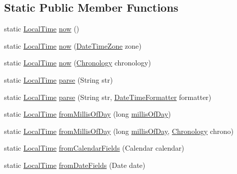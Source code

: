 \subsection*{Static Public Member Functions}
\begin{DoxyCompactItemize}
\item 
static \hyperlink{classorg_1_1joda_1_1time_1_1_local_time}{Local\-Time} \hyperlink{classorg_1_1joda_1_1time_1_1_local_time_a0439c341c8c83e1c624be6065335091b}{now} ()
\item 
static \hyperlink{classorg_1_1joda_1_1time_1_1_local_time}{Local\-Time} \hyperlink{classorg_1_1joda_1_1time_1_1_local_time_a9e4f0e11a9b7e43f07efed2547adf98b}{now} (\hyperlink{classorg_1_1joda_1_1time_1_1_date_time_zone}{Date\-Time\-Zone} zone)
\item 
static \hyperlink{classorg_1_1joda_1_1time_1_1_local_time}{Local\-Time} \hyperlink{classorg_1_1joda_1_1time_1_1_local_time_a6dccb7d9d3dbd3f82c36dd89b72cd1cd}{now} (\hyperlink{classorg_1_1joda_1_1time_1_1_chronology}{Chronology} chronology)
\item 
static \hyperlink{classorg_1_1joda_1_1time_1_1_local_time}{Local\-Time} \hyperlink{classorg_1_1joda_1_1time_1_1_local_time_a00a422bb638ad7b801794ea98f2060af}{parse} (String str)
\item 
static \hyperlink{classorg_1_1joda_1_1time_1_1_local_time}{Local\-Time} \hyperlink{classorg_1_1joda_1_1time_1_1_local_time_a31be2ec840f541810b6d22189c82195b}{parse} (String str, \hyperlink{classorg_1_1joda_1_1time_1_1format_1_1_date_time_formatter}{Date\-Time\-Formatter} formatter)
\item 
static \hyperlink{classorg_1_1joda_1_1time_1_1_local_time}{Local\-Time} \hyperlink{classorg_1_1joda_1_1time_1_1_local_time_a5439485b4aff0ad817e241cd5da729c5}{from\-Millis\-Of\-Day} (long \hyperlink{classorg_1_1joda_1_1time_1_1_local_time_a588bf52cfc5bb6f8572484819ac62456}{millis\-Of\-Day})
\item 
static \hyperlink{classorg_1_1joda_1_1time_1_1_local_time}{Local\-Time} \hyperlink{classorg_1_1joda_1_1time_1_1_local_time_a866609c778a1d5d7c5e1d4e95bf00ca3}{from\-Millis\-Of\-Day} (long \hyperlink{classorg_1_1joda_1_1time_1_1_local_time_a588bf52cfc5bb6f8572484819ac62456}{millis\-Of\-Day}, \hyperlink{classorg_1_1joda_1_1time_1_1_chronology}{Chronology} chrono)
\item 
static \hyperlink{classorg_1_1joda_1_1time_1_1_local_time}{Local\-Time} \hyperlink{classorg_1_1joda_1_1time_1_1_local_time_a5bf76e48ed92c5f71f025e9a895578f2}{from\-Calendar\-Fields} (Calendar calendar)
\item 
static \hyperlink{classorg_1_1joda_1_1time_1_1_local_time}{Local\-Time} \hyperlink{classorg_1_1joda_1_1time_1_1_local_time_a34d7d81e2576feb3019ef24b44b18616}{from\-Date\-Fields} (Date date)
\end{DoxyCompactItemize}
